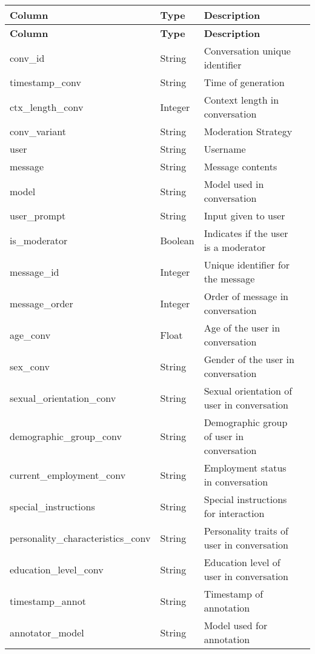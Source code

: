 \renewcommand{\arraystretch}{1.3}
\onecolumn
\begin{longtable}{|l|l|l|p{4cm}|}
    \hline
    \textbf{Column} & \textbf{Type} & \textbf{Description} \\
    \hline
    \endfirsthead
    \hline
    \textbf{Column} & \textbf{Type} & \textbf{Description} \\
    \hline
    \endhead
    \hline
    \endfoot
    \hline
    \endlastfoot

    conv\_id & String & Conversation unique identifier \\
    timestamp\_conv & String & Time of generation \\
    ctx\_length\_conv & Integer & Context length in conversation \\
    conv\_variant & String & Moderation Strategy \\
    user & String & Username \\
    message & String & Message contents \\
    model & String & Model used in conversation \\
    user\_prompt & String & Input given to user \\
    is\_moderator & Boolean & Indicates if the user is a moderator \\
    message\_id & Integer & Unique identifier for the message \\
    message\_order & Integer & Order of message in conversation \\
    age\_conv & Float & Age of the user in conversation \\
    sex\_conv & String & Gender of the user in conversation \\
    sexual\_orientation\_conv & String & Sexual orientation of user in conversation \\
    demographic\_group\_conv & String & Demographic group of user in conversation \\
    current\_employment\_conv & String & Employment status in conversation \\
    special\_instructions & String & Special instructions for interaction \\
    personality\_characteristics\_conv & String & Personality traits of user in conversation \\
    education\_level\_conv & String & Education level of user in conversation \\
    timestamp\_annot & String & Timestamp of annotation \\
    annotator\_model & String & Model used for annotation \\

\end{longtable}
